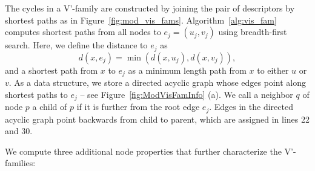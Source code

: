 \documentclass[fleqn,11pt]{article}
\begin{document}

The cycles in a V'-family are constructed by joining the pair of descriptors by shortest paths as in Figure~\ref{fig:mod_vis_fams}. Algorithm~\ref{alg:vis_fam} computes shortest paths from all nodes to $e_j = (u_j,v_j)$ using breadth-first search. Here, we define the distance to $e_j$ as
\begin{equation}
	d(x,e_j) = \min(d(x,u_j),d(x,v_j)),
\end{equation}
and a shortest path from $x$ to $e_j$ as a minimum length path from $x$ to either $u$ or $v$.
As a data structure, we store a directed acyclic graph whose edges point along shortest paths to $e_j$ -- see Figure~\ref{fig:ModVisFamInfo} (a).
We call a neighbor $q$ of node $p$ a child of $p$ if it is further from the root edge $e_j$. 
Edges in the directed acyclic graph point backwards from child to parent, which are assigned in lines 22 and 30.

We compute three additional node properties that further characterize the V'-families:
\end{document}
